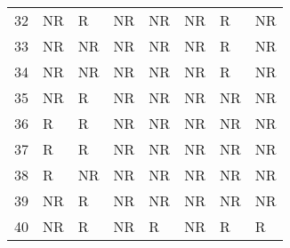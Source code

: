 \begin{tabular}{rlllllll}
32 & NR & R & NR & NR & NR & R & NR \\
33 & NR & NR & NR & NR & NR & R & NR \\
34 & NR & NR & NR & NR & NR & R & NR \\
35 & NR & R & NR & NR & NR & NR & NR \\
36 & R & R & NR & NR & NR & NR & NR \\
37 & R & R & NR & NR & NR & NR & NR \\
38 & R & NR & NR & NR & NR & NR & NR \\
39 & NR & R & NR & NR & NR & NR & NR \\
40 & NR & R & NR & R & NR & R & R \\
\bottomrule
\end{tabular}
